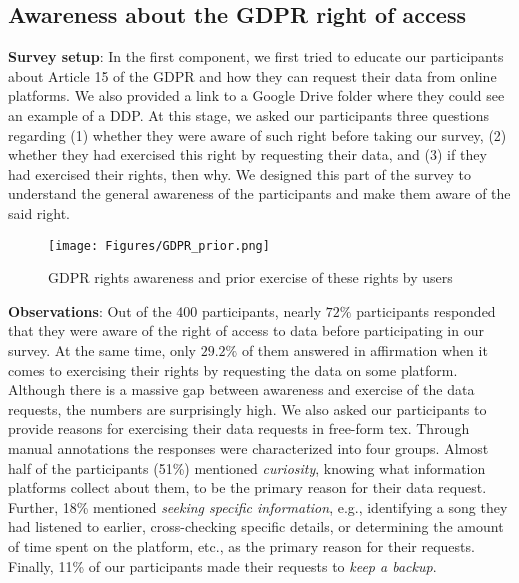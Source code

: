 \subsection{Awareness about the GDPR right of access}
\label{appendix: Awareness}
\textbf{Survey setup}: In the first component, we first tried to educate our participants about Article 15 of the GDPR and how they can request their data from online platforms. 
We also provided a link to a Google Drive folder where they could see an example of a DDP. 
At this stage, we asked our participants three questions regarding (1) whether they were aware of such right before taking our survey, (2) whether they had exercised this right by requesting their data, and (3) if they had exercised their rights, then why.
We designed this part of the survey to understand the general awareness of the participants and make them aware of the said right. 


\begin{figure}[h]
    \centering
    \texttt{[image: Figures/GDPR\_prior.png]}
    \label{gdpr_prior}
    \caption{GDPR rights awareness and prior exercise of these rights by users}
\end{figure}
\fi 
\noindent
\textbf{Observations}: Out of the 400 participants, nearly $72\%$ participants responded that they were aware of the right of access to data before participating in our survey.
At the same time, only $29.2\%$ of them answered in affirmation when it comes to exercising their rights by requesting the data on some platform. 
Although there is a massive gap between awareness and exercise of the data requests, the numbers are surprisingly high.
We also asked our participants to provide reasons for exercising their data requests in free-form tex.
Through manual annotations the responses were characterized into four groups. 
Almost half of the participants (51\%) mentioned \textit{curiosity}, knowing what information platforms collect about them, to be the primary reason for their data request.
Further, 18\% mentioned \textit{seeking specific information}, e.g., identifying a song they had listened to earlier, cross-checking specific details, or determining the amount of time spent on the platform, etc., as the primary reason for their requests.
Finally, 11\% of our participants made their requests to \textit{keep a backup}.%

